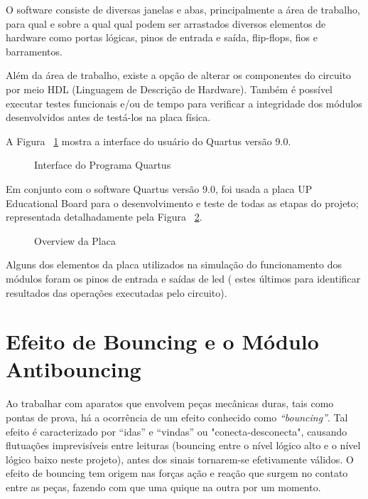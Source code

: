 \documentclass[12pt,a4paper,openany]{abntex2}
\begin{document}
O software consiste de diversas janelas e abas, principalmente a área de trabalho, para qual e sobre a qual qual podem ser arrastados diversos elementos de hardware como portas lógicas, pinos de entrada e saída, flip-flops, fios e barramentos.

Além da área de trabalho, existe a opção de alterar os componentes do circuito por meio HDL (Linguagem de Descrição de Hardware). Também é possível executar testes funcionais e/ou de tempo para verificar a integridade dos módulos desenvolvidos antes de testá-los na placa física.

A Figura ~\ref{fig:interface-quartus} mostra a interface do usuário do Quartus versão 9.0.

\begin{figure}[!htp]
	\centering
	\caption{Interface do Programa Quartus}
	\label{fig:interface-quartus}
\end{figure}

Em conjunto com o software Quartus versão 9.0, foi usada a placa UP Educational Board para o desenvolvimento e teste de todas as etapas do projeto; representada detalhadamente pela Figura ~\ref{fig:placa-1}.

\begin{figure}[!htp]
	\centering
	\caption{Overview da Placa}
	\label{fig:placa-1}
\end{figure}

Alguns dos elementos da placa utilizados na simulação do funcionamento dos módulos foram os pinos de entrada e saídas de led ( estes últimos para identificar resultados das operações executadas pelo circuito).

\section{Efeito de Bouncing e o Módulo Antibouncing}

Ao trabalhar com aparatos que envolvem peças mecânicas duras, tais como pontas de prova, há a ocorrência de um efeito conhecido como \textit{“bouncing”}. Tal efeito é caracterizado por “idas” e “vindas” ou "conecta-desconecta", causando flutuações imprevisíveis entre leituras (bouncing entre o nível lógico alto e o nível
lógico baixo neste projeto), antes dos sinais tornarem-se efetivamente válidos. O efeito de bouncing tem origem nas forças ação e reação que surgem no contato entre as peças, fazendo com que uma quique na outra por um momento.
\end{document}
